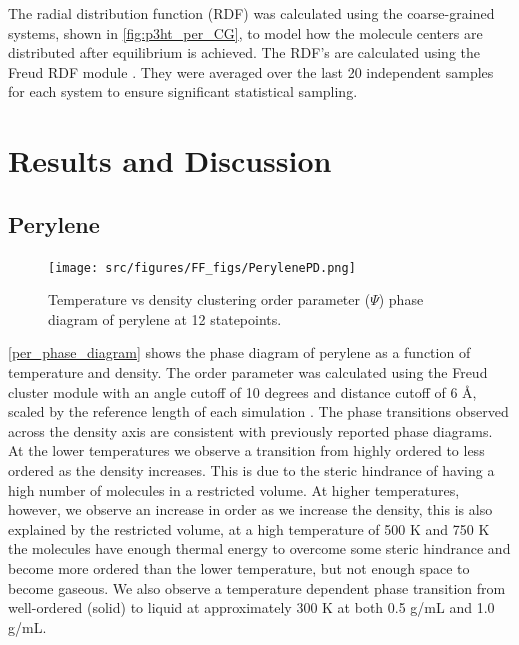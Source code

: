 \par The radial distribution function (RDF) was calculated using the coarse-grained systems, shown in \autoref{fig:p3ht_per_CG}, to model how the molecule centers are distributed after equilibrium is achieved. The RDF’s are calculated using the Freud RDF module \citep{freud2020}. They were averaged over the last 20 independent samples for each system to ensure significant statistical sampling.

\section{Results and Discussion}

\subsection{Perylene}

\begin{figure}[ht]
    \centering
    \texttt{[image: src/figures/FF\_figs/PerylenePD.png]} %
    \caption{Temperature vs density clustering order parameter ($\Psi$) phase diagram of perylene at 12 statepoints.}
    \label{per_phase_diagram}
\end{figure}

\par \autoref{per_phase_diagram} shows the phase diagram of perylene as a function of temperature and density. The order parameter was calculated using the Freud cluster module with an angle cutoff of 10 degrees and distance cutoff of 6 \AA, scaled by the reference length of each simulation \citep{freud2020}. The phase transitions observed across the density axis are consistent with previously reported phase diagrams. At the lower temperatures we observe a transition from highly ordered to less ordered as the density increases. This is due to the steric hindrance of having a high number of molecules in a restricted volume. At higher temperatures, however, we observe an increase in order as we increase the density, this is also explained by the restricted volume, at a high temperature of 500 K and 750 K the molecules have enough thermal energy to overcome some steric hindrance and become more ordered than the lower temperature, but not enough space to become gaseous. We also observe a temperature dependent phase transition from well-ordered (solid) to liquid at approximately 300 K at both 0.5 g/mL and 1.0 g/mL. 

